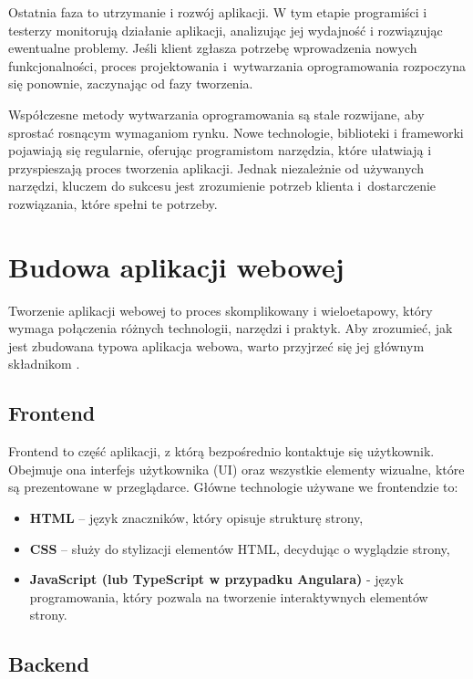 Ostatnia faza to utrzymanie i rozwój aplikacji. W tym etapie programiści i testerzy monitorują działanie aplikacji, analizując jej wydajność i rozwiązując ewentualne problemy. Jeśli klient zgłasza potrzebę wprowadzenia nowych funkcjonalności, proces projektowania i~wytwarzania oprogramowania rozpoczyna się ponownie, zaczynając od fazy tworzenia.

Współczesne metody wytwarzania oprogramowania są stale rozwijane, aby sprostać rosnącym wymaganiom rynku. Nowe technologie, biblioteki i frameworki pojawiają się regularnie, oferując programistom narzędzia, które ułatwiają i przyspieszają proces tworzenia aplikacji. Jednak niezależnie od używanych narzędzi, kluczem do sukcesu jest zrozumienie potrzeb klienta i~dostarczenie rozwiązania, które spełni te potrzeby.


\section{Budowa aplikacji webowej}

Tworzenie aplikacji webowej to proces skomplikowany i wieloetapowy, który wymaga połączenia różnych technologii, narzędzi i praktyk. Aby zrozumieć, jak jest zbudowana typowa aplikacja webowa, warto przyjrzeć się jej głównym składnikom \cite{budowaAplikacji}.

\subsection{Frontend}

Frontend to część aplikacji, z którą bezpośrednio kontaktuje się użytkownik. Obejmuje ona interfejs użytkownika (UI) oraz wszystkie elementy wizualne, które są prezentowane w przeglądarce. Główne technologie używane we frontendzie to:

\begin{itemize}
\item \textbf{HTML} -- język znaczników, który opisuje strukturę strony,
\item \textbf{CSS} -- służy do stylizacji elementów HTML, decydując o wyglądzie strony,
\item \textbf{JavaScript (lub TypeScript w przypadku Angulara)} - język programowania, który pozwala na tworzenie interaktywnych elementów strony.
\end{itemize}

\subsection{Backend}

